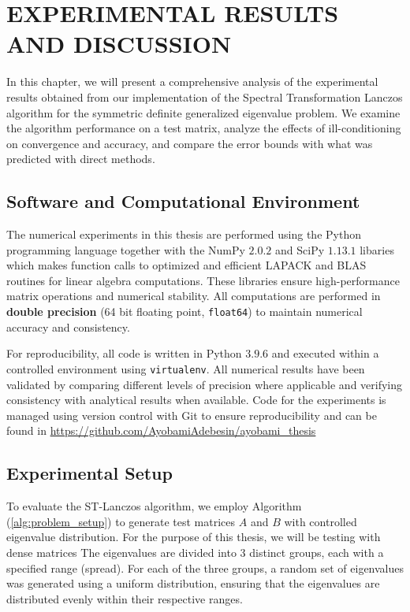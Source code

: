 \chapter{EXPERIMENTAL RESULTS AND DISCUSSION}

In this chapter, we will present a comprehensive analysis of the experimental results obtained from our implementation of the Spectral Transformation Lanczos algorithm for the symmetric definite generalized eigenvalue problem. We examine the algorithm performance on a test matrix, analyze the effects of ill-conditioning on convergence and accuracy, and compare the error bounds with what was predicted with direct methods.

\section{Software and Computational Environment}
The numerical experiments in this thesis are performed using the Python programming language together with the NumPy $2.0.2$ and SciPy $1.13.1$ libaries which makes function calls to optimized and efficient LAPACK and BLAS routines for linear algebra computations. These libraries ensure high-performance matrix operations and numerical stability. All computations are performed in \textbf{double precision} (64 bit floating point, \texttt{float64}) to maintain numerical accuracy and consistency.

For reproducibility, all code is written in Python $3.9.6$ and executed within a controlled environment using \texttt{virtualenv}. All numerical results have been validated by comparing different levels of precision where applicable and verifying consistency with analytical results when available. Code for the experiments is managed using version control with Git to ensure reproducibility and can be found in \href{https://github.com/AyobamiAdebesin/ayobami_thesis}{https://github.com/AyobamiAdebesin/ayobami\_thesis}

\section{Experimental Setup}
To evaluate the ST-Lanczos algorithm, we employ Algorithm (\ref{alg:problem_setup}) to generate test matrices $A$ and $B$ with controlled eigenvalue distribution. For the purpose of this thesis, we will be testing with dense matrices The eigenvalues are divided into 3 distinct groups, each with a specified range (spread). For each of the three groups, a random set of eigenvalues was generated using a uniform distribution, ensuring that the eigenvalues are distributed evenly within their respective ranges.

